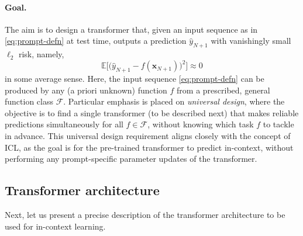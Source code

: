 \documentclass[english]{article}
\begin{document}
\paragraph{Goal.} The aim is to design a transformer that, given an input sequence as in \eqref{eq:prompt-defn} at test time, outputs a prediction $\widehat{y}_{N+1}$ with vanishingly small $\ell_2$ risk, namely,  
%
$$
	\mathbb{E}\big[ \big( \widehat{y}_{N+1} - f(\bm{x}_{N+1}) \big)^2\big] \approx 0
$$ 
in some average sense. Here, the input sequence \eqref{eq:prompt-defn} can be produced by any (a priori unknown) function $f$ from a prescribed, general function class $\mathcal{F}$. 
    Particular emphasis is placed on {\em universal design}, where the objective is to find a single transformer (to be described next) that makes reliable predictions simultaneously for all $f\in \mathcal{F}$, without knowing which task $f$ to tackle in advance. 
    This universal design requirement aligns closely with the concept of ICL, as the goal is for the pre-trained transformer to predict in-context, without performing any prompt-specific parameter updates of the transformer. 
    






\subsection{Transformer architecture} 
%
Next, let us present a precise description of the transformer architecture to be used for in-context learning. 
\end{document}
